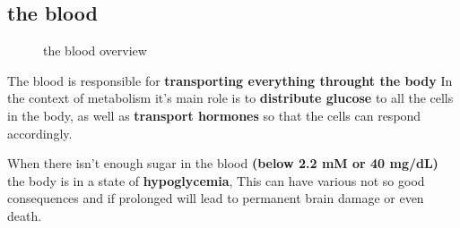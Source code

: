 \documentclass[../main.tex]{subfiles}
\begin{document}
\subsection{the blood}
\begin{figure}[H]
	\centering
	\caption{the blood overview}
\end{figure}
The blood is responsible for \textbf{transporting everything throught the body} In the context of metabolism it's main role is to \textbf{distribute glucose} to all the cells in the body, as well as \textbf{transport hormones }so that the cells can respond accordingly.

When there isn't enough sugar in the blood \textbf{(below 2.2 mM or 40 mg/dL)} the body is in a state of \textbf{\gls{hypoglycemia}}, This can have various not so good consequences and if prolonged will lead to permanent brain damage or even death.
\end{document}
